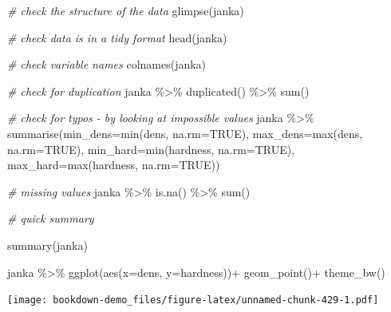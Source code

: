 \documentclass[
]{book}
\newenvironment{Shaded}{\begin{snugshade}}{\end{snugshade}}
\newcommand{\AttributeTok}[1]{\textcolor[rgb]{0.77,0.63,0.00}{#1}}
\newcommand{\CommentTok}[1]{\textcolor[rgb]{0.56,0.35,0.01}{\textit{#1}}}
\newcommand{\ConstantTok}[1]{\textcolor[rgb]{0.00,0.00,0.00}{#1}}
\newcommand{\FunctionTok}[1]{\textcolor[rgb]{0.00,0.00,0.00}{#1}}
\newcommand{\NormalTok}[1]{#1}
\newcommand{\SpecialCharTok}[1]{\textcolor[rgb]{0.00,0.00,0.00}{#1}}
\begin{document}
\begin{Shaded}
\begin{Highlighting}[]
\CommentTok{\# check the structure of the data}
\FunctionTok{glimpse}\NormalTok{(janka)}

\CommentTok{\# check data is in a tidy format}
\FunctionTok{head}\NormalTok{(janka)}

\CommentTok{\# check variable names}
\FunctionTok{colnames}\NormalTok{(janka)}

\CommentTok{\# check for duplication}
\NormalTok{janka }\SpecialCharTok{\%\textgreater{}\%} 
  \FunctionTok{duplicated}\NormalTok{() }\SpecialCharTok{\%\textgreater{}\%} 
  \FunctionTok{sum}\NormalTok{()}

\CommentTok{\# check for typos {-} by looking at impossible values}
\NormalTok{janka }\SpecialCharTok{\%\textgreater{}\%} 
  \FunctionTok{summarise}\NormalTok{(}\AttributeTok{min\_dens=}\FunctionTok{min}\NormalTok{(dens, }\AttributeTok{na.rm=}\ConstantTok{TRUE}\NormalTok{), }
            \AttributeTok{max\_dens=}\FunctionTok{max}\NormalTok{(dens, }\AttributeTok{na.rm=}\ConstantTok{TRUE}\NormalTok{),}
            \AttributeTok{min\_hard=}\FunctionTok{min}\NormalTok{(hardness, }\AttributeTok{na.rm=}\ConstantTok{TRUE}\NormalTok{), }
            \AttributeTok{max\_hard=}\FunctionTok{max}\NormalTok{(hardness, }\AttributeTok{na.rm=}\ConstantTok{TRUE}\NormalTok{))}


\CommentTok{\# missing values}
\NormalTok{janka }\SpecialCharTok{\%\textgreater{}\%} 
  \FunctionTok{is.na}\NormalTok{() }\SpecialCharTok{\%\textgreater{}\%} 
  \FunctionTok{sum}\NormalTok{()}

\CommentTok{\# quick summary}

\FunctionTok{summary}\NormalTok{(janka)}
\end{Highlighting}
\end{Shaded}

\begin{Shaded}
\begin{Highlighting}[]
\NormalTok{janka }\SpecialCharTok{\%\textgreater{}\%} 
  \FunctionTok{ggplot}\NormalTok{(}\FunctionTok{aes}\NormalTok{(}\AttributeTok{x=}\NormalTok{dens, }\AttributeTok{y=}\NormalTok{hardness))}\SpecialCharTok{+}
  \FunctionTok{geom\_point}\NormalTok{()}\SpecialCharTok{+}
  \FunctionTok{theme\_bw}\NormalTok{()}
\end{Highlighting}
\end{Shaded}

\texttt{[image: bookdown-demo\_files/figure-latex/unnamed-chunk-429-1.pdf]}
\end{document}
